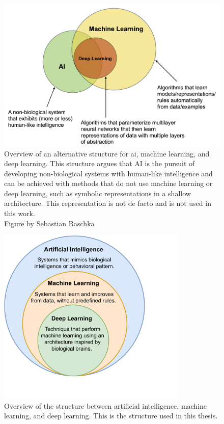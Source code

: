     \begin{figure}[htb]
        \centering
        \includegraphics[width=\linewidth]{images/ai_ml_dnn_argue.jpeg}
        \caption[Overview of an alternative structure to the one used in this work for AI, machine learning, and deep learning.]{Overview of an alternative structure for \gls{ai}, machine learning, and deep learning. This structure argues that AI is the pursuit of developing non-biological systems with human-like intelligence and can be achieved with methods that do not use machine learning or deep learning, such as symbolic representations in a shallow architecture. This representation is not de facto and is not used in this work.\\Figure by Sebastian Raschka \cite{raschkaChapterIntroductionMachine2020}}
        \label{fig:ai_ml_dnn_argue}
    \end{figure} 

    \begin{figure}[htb]
        \centering
        \includegraphics[width=9cm]{images/ai_ml_dnn}
        \caption[Overview of the structure between artificial intelligence, machine learning, and deep learning. This is the structure used in this thesis.]{Overview of the structure between artificial intelligence, machine learning, and deep learning. This is the structure used in this thesis.%
        }
        \label{fig:ai_ml_dnn}
    \end{figure} 

